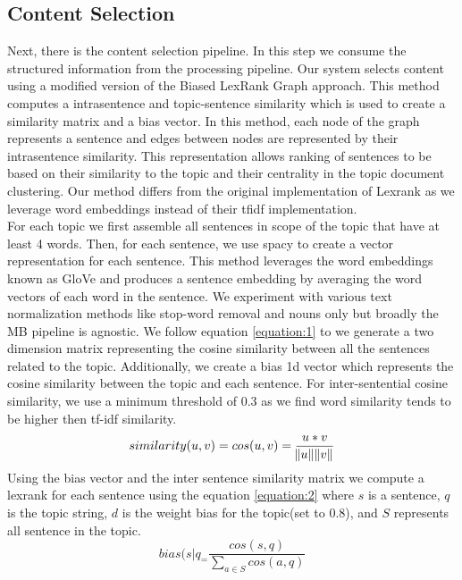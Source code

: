 \documentclass[11pt,a4paper]{article}
\begin{document}
\subsection{Content Selection}
Next, there is the content selection pipeline. In this step we consume the structured information from the processing pipeline. Our system selects content using a modified version of the Biased LexRank Graph approach. This method computes a intrasentence and topic-sentence similarity which is used to create a similarity matrix and a bias vector. In this method, each node of the graph represents a sentence and edges between nodes are represented by their intrasentence similarity. This representation allows ranking of sentences to be based on their similarity to the topic and their centrality in the topic document clustering. Our method differs from the original implementation of Lexrank\cite{otterbacher-etal-2005-using} as we leverage word embeddings instead of their tfidf implementation. \\ 
For each topic we first assemble all sentences in scope of the topic that have at least 4 words. Then, for each sentence, we use spacy to create a vector representation for each sentence. This method leverages the word embeddings known as GloVe \cite{Pennington2014GloveGV} and produces a sentence embedding by averaging the word vectors of each word in the sentence. We experiment with various text normalization methods like stop-word removal and nouns only but broadly the MB pipeline is agnostic. We follow equation \ref{equation:1} to we generate a two dimension matrix representing the cosine similarity between all the sentences related to the topic. Additionally, we create a bias 1d vector which represents the cosine similarity between the topic and each sentence. For inter-sentential cosine similarity, we use a minimum threshold of 0.3 as we find word similarity tends to be higher then tf-idf similarity.\\
\begin{equation}
\label{equation:1}
similarity(u,v) = cos(u,v) = \frac{u * v}{\norm{u}\norm{v}}
\end{equation}
Using the bias vector and the inter sentence similarity matrix we compute a lexrank for each sentence using the equation \ref{equation:2} where $s$ is a sentence, $q$ is the topic string, $d$ is the weight bias for the topic(set to 0.8), and $S$ represents all sentence in the topic. 
\begin{equation}
   bias(s|q_ =  \frac{cos(s,q)}{\sum_{a \in S} cos(a,q) }
\end{equation}
\end{document}
